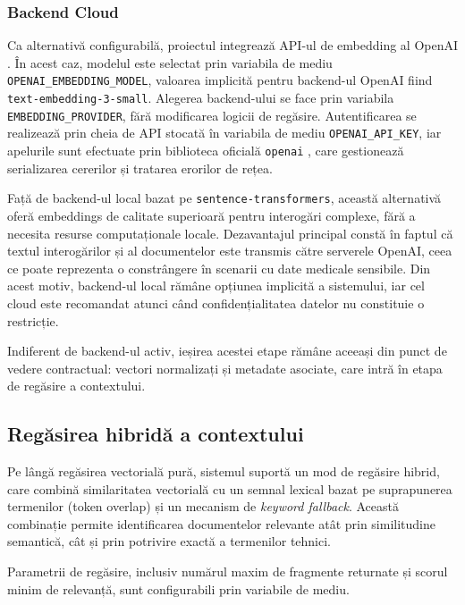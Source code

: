 \documentclass[12pt, a4paper, oneside, romanian]{teza-upb}
\begin{document}
\subsubsection{Backend Cloud}

Ca alternativă configurabilă, proiectul integrează API-ul de embedding al OpenAI \cite{openai_embeddings}. În acest caz, modelul este selectat prin variabila de mediu \texttt{OPENAI\_EMBEDDING\_MODEL}, valoarea implicită pentru backend-ul OpenAI fiind \texttt{text-embedding-3-small}. Alegerea backend-ului se face prin variabila \texttt{EMBEDDING\_PROVIDER}, fără modificarea logicii de regăsire. Autentificarea se realizează prin cheia de API stocată în variabila de mediu \texttt{OPENAI\_API\_KEY}, iar apelurile sunt efectuate prin biblioteca oficială \texttt{openai} \cite{openai_api}, care gestionează serializarea cererilor și tratarea erorilor de rețea.

Față de backend-ul local bazat pe \texttt{sentence-transformers}, această 
alternativă oferă embeddings de calitate superioară pentru interogări complexe, 
fără a necesita resurse computaționale locale. Dezavantajul principal constă 
în faptul că textul interogărilor și al documentelor este transmis către 
serverele OpenAI, ceea ce poate reprezenta o constrângere în scenarii cu date 
medicale sensibile. Din acest motiv, backend-ul local rămâne opțiunea implicită 
a sistemului, iar cel cloud este recomandat atunci când confidențialitatea 
datelor nu constituie o restricție.

Indiferent de backend-ul activ, ieșirea acestei etape rămâne aceeași din punct de vedere contractual: vectori normalizați și metadate asociate, care intră în etapa de regăsire a contextului.

\subsection{Regăsirea hibridă a contextului}

Pe lângă regăsirea vectorială pură, sistemul suportă un mod de regăsire hibrid, care combină similaritatea vectorială cu un semnal lexical bazat pe suprapunerea termenilor (token overlap) și un mecanism de \textit{keyword fallback}.  Această combinație permite identificarea documentelor relevante atât prin similitudine semantică, cât și prin potrivire exactă a termenilor tehnici.

Parametrii de regăsire, inclusiv numărul maxim de fragmente returnate și scorul minim de relevanță, sunt configurabili prin variabile de mediu.
\end{document}
